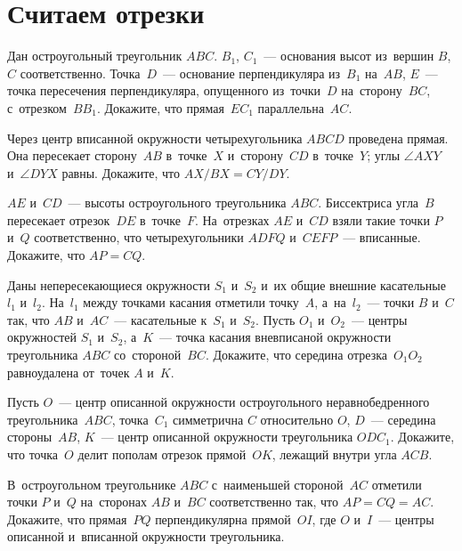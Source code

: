 
\section*{Считаем отрезки}


\begin{problems}

\item
Дан остроугольный треугольник $ABC$.
$B_1$, $C_1$~--- основания высот из~вершин $B$, $C$ соответственно.
Точка~$D$~--- основание перпендикуляра из~$B_1$ на~$AB$, $E$~--- точка
пересечения перпендикуляра, опущенного из~точки~$D$ на~сторону~$BC$,
с~отрезком~$B B_1$.
Докажите, что прямая~$E C_1$ параллельна~$AC$.

\item
Через центр вписанной окружности четырехугольника $ABCD$ проведена
прямая.
Она пересекает сторону~$AB$ в~точке~$X$ и~сторону~$CD$ в~точке~$Y$;
углы $\angle AXY$ и~$\angle DYX$ равны.
Докажите, что $AX / BX = CY / DY$.

\item
$AE$ и~$CD$~--- высоты остроугольного треугольника $ABC$.
Биссектриса угла~$B$ пересекает отрезок~$DE$ в~точке~$F$.
На~отрезках $AE$ и~$CD$ взяли такие точки $P$ и~$Q$ соответственно, что
четырехугольники $ADFQ$ и~$CEFP$~--- вписанные.
Докажите, что $AP = CQ$.

\item
Даны непересекающиеся окружности $S_1$ и~$S_2$ и~их общие внешние
касательные $l_1$ и~$l_2$.
На~$l_1$ между точками касания отметили точку~$A$, а~на~$l_2$~---
точки $B$ и~$C$ так, что $AB$ и~$AC$~--- касательные к~$S_1$ и~$S_2$.
Пусть $O_1$ и~$O_2$~--- центры окружностей $S_1$ и~$S_2$, а~$K$~--- точка
касания вневписаной окружности треугольника $ABC$ со~стороной~$BC$.
Докажите, что середина отрезка~$O_1 O_2$ равноудалена от~точек $A$ и~$K$.

\item
Пусть $O$~--- центр описанной окружности остроугольного неравнобедренного
треугольника~$ABC$, точка~$C_1$ симметрична $C$ относительно $O$,
$D$~--- середина стороны~$AB$, $K$~--- центр описанной окружности
треугольника $O D C_1$.
Докажите, что точка~$O$ делит пополам отрезок прямой~$OK$, лежащий внутри
угла $ACB$.

\item
В~остроугольном треугольнике $ABC$ с~наименьшей стороной~$AC$ отметили
точки $P$ и~$Q$ на~сторонах $AB$ и~$BC$ соответственно так, что $AP = CQ = AC$.
Докажите, что прямая~$PQ$ перпендикулярна прямой~$OI$, где $O$ и~$I$~---
центры описанной и~вписанной окружности треугольника.


\end{problems}
